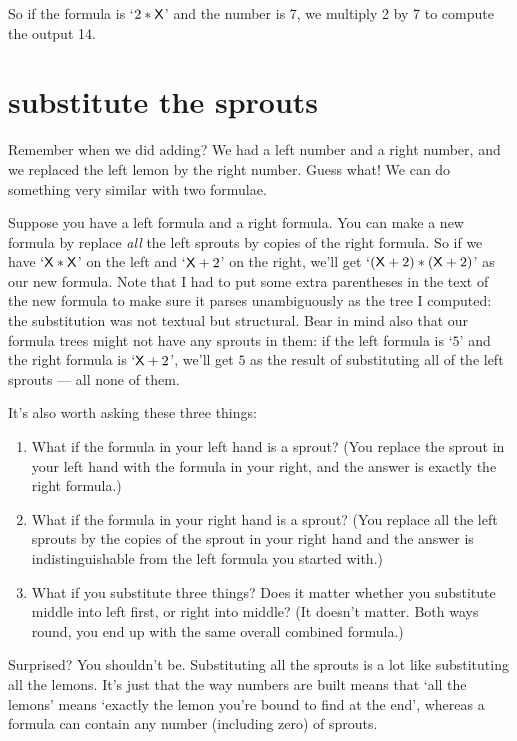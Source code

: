 \documentclass{book}
\begin{document}
So if the formula is `$2*\mathsf{X}$' and the number is 7, we multiply 2 by 7 to compute the output 14.


\section{substitute the sprouts}

Remember when we did adding? We had a left number and a right number, and we replaced the left lemon by the right number. Guess what! We can do something very similar with two formulae.

Suppose you have a left formula and a right formula. You can make a new formula by replace \emph{all} the left sprouts by copies of the right formula. So if we have `$\mathsf{X}*\mathsf{X}$' on the left and `$\mathsf{X}+2$' on the right, we'll get `$(\mathsf{X}+2)*(\mathsf{X}+2)$' as our new formula. Note that I had to put some extra parentheses in the text of the new formula to make sure it parses unambiguously as the tree I computed: the substitution was not textual but structural. Bear in mind also that our formula trees might not have any sprouts in them: if the left formula is `$5$' and the right formula is `$\mathsf{X}+2$', we'll get $5$ as the result of substituting all of the left sprouts --- all none of them.

It's also worth asking these three things:
\begin{enumerate}
\item What if the formula in your left hand is a sprout? (You replace the sprout in your left hand with the formula in your right, and the answer is exactly the right formula.)
\item What if the formula in your right hand is a sprout? (You replace all the left sprouts by the copies of the sprout in your right hand and the answer is indistinguishable from the left formula you started with.)
\item What if you substitute three things? Does it matter whether you substitute middle into left first, or right into middle? (It doesn't matter. Both ways round, you end up with the same overall combined formula.)
\end{enumerate}

Surprised? You shouldn't be. Substituting all the sprouts is a lot like substituting all the lemons. It's just that the way numbers are built means that `all the lemons' means `exactly the lemon you're bound to find at the end', whereas a formula can contain any number (including zero) of sprouts.
\end{document}
